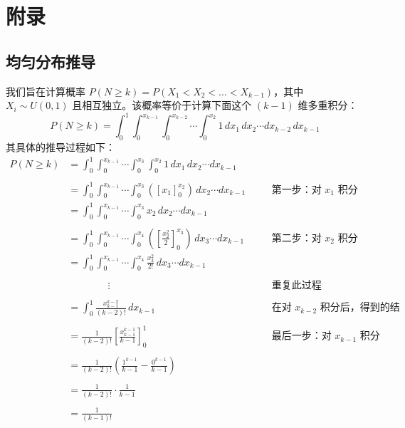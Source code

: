 \documentclass{article}
\begin{document}
\section{附录}
\subsection{均匀分布推导}
我们旨在计算概率 $P(N \ge k) = P(X_1 < X_2 < \dots < X_{k-1})$，其中 $X_i \sim U(0,1)$ 且相互独立。该概率等价于计算下面这个 $(k-1)$ 维多重积分：
$$ P(N \ge k) = \int_0^1 \int_0^{x_{k-1}} \int_0^{x_{k-2}} \cdots \int_0^{x_2} 1 \, dx_1 \, dx_2 \cdots dx_{k-2} \, dx_{k-1} $$
其具体的推导过程如下：
\begin{align*}
    P(N \ge k) &= \int_0^1 \int_0^{x_{k-1}} \cdots \int_0^{x_3} \int_0^{x_2} 1 \, dx_1 \, dx_2 \cdots dx_{k-1} \\
    \\
    &= \int_0^1 \int_0^{x_{k-1}} \cdots \int_0^{x_3} \left( [x_1]_0^{x_2} \right) \, dx_2 \cdots dx_{k-1} \quad &&\text{第一步：对 $x_1$ 积分} \\
    &= \int_0^1 \int_0^{x_{k-1}} \cdots \int_0^{x_3} x_2 \, dx_2 \cdots dx_{k-1} \\
    \\
    &= \int_0^1 \int_0^{x_{k-1}} \cdots \int_0^{x_4} \left( \left[ \frac{x_2^2}{2} \right]_0^{x_3} \right) \, dx_3 \cdots dx_{k-1} \quad &&\text{第二步：对 $x_2$ 积分} \\
    &= \int_0^1 \int_0^{x_{k-1}} \cdots \int_0^{x_4} \frac{x_3^2}{2!} \, dx_3 \cdots dx_{k-1} \\
    \\
    &\qquad\qquad \vdots \quad &&\text{重复此过程} \\
    \\
    &= \int_0^1 \frac{x_{k-1}^{k-2}}{(k-2)!} \, dx_{k-1} \quad &&\text{在对 $x_{k-2}$ 积分后，得到的结果}\\
    \\
    &= \frac{1}{(k-2)!} \left[ \frac{x_{k-1}^{k-1}}{k-1} \right]_0^1 \quad &&\text{最后一步：对 $x_{k-1}$ 积分} \\
    \\
    &= \frac{1}{(k-2)!} \left( \frac{1^{k-1}}{k-1} - \frac{0^{k-1}}{k-1} \right) \\
    \\
    &= \frac{1}{(k-2)!} \cdot \frac{1}{k-1} \\
    \\
    &= \frac{1}{(k-1)!}
    \end{align*}
\end{document}
